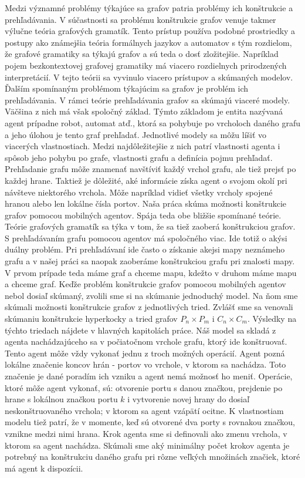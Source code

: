 Medzi významné problémy týkajúce sa grafov patria problémy ich
konštrukcie a prehľadávania. V súčastnosti sa problému konštrukcie grafov
venuje takmer výlučne teória grafových gramatík. Tento prístup používa
podobné prostriedky a postupy ako známejšia teória formálnych jazykov a
automatov s tým rozdielom, že grafové gramatiky sa týkajú grafov a sú teda o
dosť zložitejšie. Napríklad pojem bezkontextovej grafovej gramatiky má
viacero rozdielnych prirodzených interpretácií. V tejto teórii sa vyvinulo
viacero prístupov a skúmaných modelov.
Ďalším spomínaným problémom týkajúcim sa grafov je problém ich prehľadávania.
V rámci teórie prehľadávania grafov sa skúmajú viaceré modely. Väčšina z
nich má však spoločný základ. Týmto základom je entita nazývaná agent
prípadne robot, automat atď., ktorá sa pohybuje po vrcholoch daného grafu 
a jeho úlohou
je tento graf prehľadať. Jednotlivé modely sa môžu líšiť vo viacerých 
vlastnostiach.
Medzi najdôležitejšie z nich patrí vlastnosti agenta i spôsob jeho pohybu 
po grafe, vlastnosti grafu a definícia pojmu prehľadať. Prehľadanie grafu môže
znamenať navštíviť každý vrchol grafu, ale tiež prejsť po každej hrane.
Taktiež je dôležité, aké informácie získa agent o svojom okolí pri návšteve
niektorého vrchola. Môže napríklad vidieť všetky vrcholy spojené hranou alebo
len lokálne čísla portov.
Naša práca skúma možnosti konštrukcie grafov pomocou mobilných agentov.
Spája teda obe bližšie spomínané teórie. Teórie grafových gramatík sa týka v
tom, že sa tiež zaoberá konštrukciou grafov. S prehľadávaním grafu pomocou
agentov má spoločného viac. Ide totiž o akýsi duálny problém. Pri
prehľadávaní ide často o získanie akejsi mapy neznámeho grafu a v našej
práci sa naopak zaoberáme konštrukciou grafu pri znalosti mapy. V prvom
prípade teda máme graf a chceme mapu, kdežto v druhom máme mapu a chceme
graf.
Keďže problém konštrukcie grafov pomocou mobilných agentov nebol dosiaľ
skúmaný, zvolili sme si na skúmanie jednoduchý model.
Na ňom sme skúmali možnosti konštrukcie grafov z jednotlivých tried. Zvlášť
sme sa venovali skúmaniu konštrukcie hyperkocky a tried grafov $P_{n} \times
P_{m}$ i $C_{n} \times C_{m}$. Výsledky na týchto triedach nájdete v
hlavných kapitolách práce.
Náš model sa skladá z
agenta nachádzajúceho sa v počiatočnom vrchole grafu, ktorý ide konštruovať.
Tento agent môže vždy vykonať jednu z troch možných operácií. Agent pozná
lokálne značenie koncov hrán - portov vo vrchole, v ktorom sa nachádza.
Toto značenie je dané poradím ich vzniku a agent nemá možnosť ho meniť.
Operácie, ktoré môže agent vykonať, sú: otvorenie portu s danou značkou,
prejdenie po hrane s lokálnou značkou portu $k$ i vytvorenie novej hrany do
dosiaľ neskonštruovaného vrchola; v ktorom sa agent vzápätí ocitne. K
vlastnostiam modelu tiež patrí, že v momente, keď sú otvorené dva porty s
rovnakou značkou, vznikne medzi nimi hrana.
Krok agenta sme si definovali ako zmenu vrchola, v ktorom sa agent nachádza.
Skúmali sme aký minimálny počet krokov agenta je potrebný na konštrukciu
daného grafu pri rôzne veľkých množinách značiek, ktoré má agent k
dispozícii.

